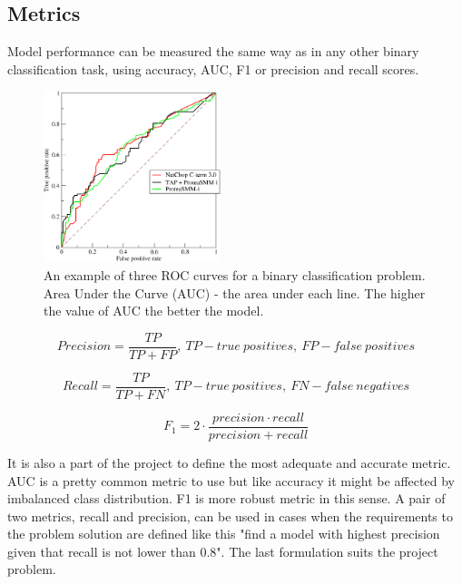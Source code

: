 \documentclass[a4paper]{article}
\begin{document}
    \pagebreak
    \subsection*{Metrics}
    
    Model performance can be measured the same way as in any other binary classification task,
    using accuracy, AUC, F1 or precision and recall scores.
    
    \begin{figure}[H]
        \centering
        \includegraphics[width=\textwidth,height=5cm,keepaspectratio]{roccurves.png}
        \caption{An example of three ROC curves for a binary classification problem.
        Area Under the Curve (AUC) - the area under each line. The higher the value
        of AUC the better the model.}
    \end{figure}
    
    \begin{equation*}
    Precision = \frac{TP}{TP + FP},\ TP - true\ positives,\ FP - false\ positives
    \end{equation*}
    
    \begin{equation*}
    Recall = \frac{TP}{TP + FN},\ TP - true\ positives,\ FN - false\ negatives
    \end{equation*}
    
    \begin{equation*}
    F_1 = 2 \cdot \frac{precision \cdot recall}{precision + recall}
    \end{equation*}
    
    It is also a part of the project to define the most adequate and accurate metric.
    AUC is a pretty common metric to use but like accuracy it might be affected by imbalanced class distribution.
    F1 is more robust metric in this sense. A pair of two metrics, recall and precision, can be
    used in cases when the requirements to the problem solution are defined like this 
    "find a model with highest precision given that recall is not lower than 0.8".
    The last formulation suits the project problem.
    
\end{document}
